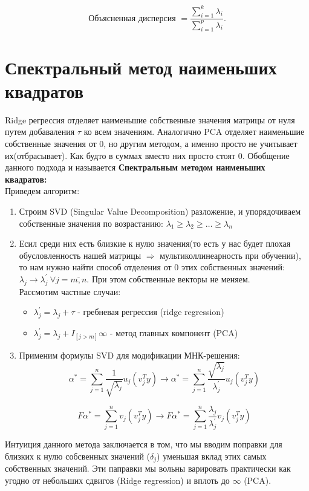 $$
\text { Объясненная дисперсия }=\frac{\sum_{i=1}^k \lambda_i}{\sum_{i=1}^p \lambda_i} \text {. }
$$

\section{Спектральный метод наименьших квадратов}

Ridge регрессия отделяет наименьшие собственные значения матрицы от нуля путем добаваления $\tau$ ко всем значениям. Аналогично PCA отделяет наименьшие собственные значения от 0, но другим методом, а именно просто не учитывает их(отбрасывает). Как будто в суммах вместо них просто стоят 0. Обобщение данного подхода и называется \textbf{Спектральным методом наименьших квадратов: } \\
Приведем алгоритм: 
\begin{enumerate}
    \item Строим SVD (Singular Value Decomposition) разложение, и упорядочиваем собственные значения по возрастанию: $\lambda_1 \geq \lambda_2 \geq \dots \geq \lambda_n$
    \item Есил среди них есть близкие к нулю значения(то есть у нас будет плохая обусловленность нашей матрицы $\Rightarrow$ мультиколлинеарность при обучении), то нам нужно найти способ отделения от 0 этих собственных значений: $\lambda_j \rightarrow \lambda^{'}_j \ \forall j = \overline{m,n}$. При этом собственные векторы не меняем. \\
    Рассмотим частные случаи:
    \begin{itemize}
        \item $\lambda^{'}_j = \lambda_j + \tau$ - гребневая регрессия (ridge regression)
        \item $\lambda^{'}_j = \lambda_j + I_{[j > m]}\infty$ - метод главных компонент (PCA)      
    \end{itemize}

    \item Применим формулы SVD для модификации МНК-решения: \\
     $$\alpha^{*} = \sum_{j =1}^{n} \frac{1}{\sqrt{\lambda_j}} u_j(v_j^Ty)  \rightarrow \alpha^{*} = \sum_{j =1}^{n} \frac{\sqrt{\lambda_j}}{\lambda^{'}_j} u_j(v_j^Ty)$$
     
     $$F\alpha^{*} = \sum_{j =1}^{n} v_j(v_j^Ty) \rightarrow F\alpha^{*} = \sum_{j =1}^{n} \frac{\lambda_j}{\lambda^{'}_j} v_j(v_j^Ty)
     $$
\end{enumerate}
Интуиция данного метода заключается в том, что мы вводим поправки для близких к нулю собсвенных значений ($\delta_j$) уменьшая вклад этих самых собственных значений. Эти паправки мы вольны варировать практически как угодно от небольших сдвигов (Ridge regression) и вплоть до $\infty$ (PCA).

